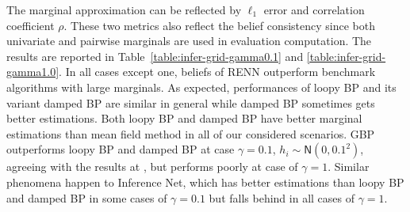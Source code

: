 The marginal approximation can be reflected by $\ell_1$ error and correlation coefficient $\rho$. These two metrics also reflect the belief consistency since both univariate and pairwise marginals are used in evaluation computation. The results are reported in Table~\ref{table:infer-grid-gamma0.1} and \ref{table:infer-grid-gamma1.0}. In all cases except one, beliefs of RENN outperform benchmark algorithms with large marginals. As expected, performances of loopy BP and its variant damped BP are similar in general while damped BP sometimes gets better estimations. Both loopy BP and damped BP have better marginal estimations than mean field method in all of our considered scenarios. GBP outperforms loopy BP and damped BP at case $\gamma=0.1$, $h_i\sim \mathsf{N}(0,0.1^2)$, agreeing with the results at \cite{yedida2005constucting}, but performs poorly at case of $\gamma=1$. Similar phenomena happen to Inference Net, which has better estimations than loopy BP and damped BP in some cases of $\gamma=0.1$ but falls behind in all cases of $\gamma=1$.


